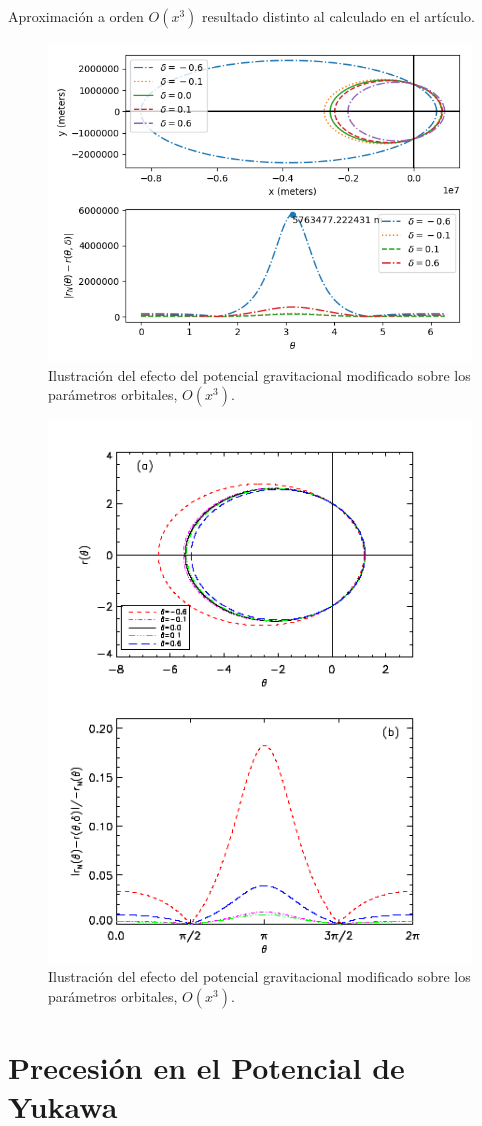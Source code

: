 \documentclass{beamer}
\begin{document}
\begin{frame}[allowframebreaks]{Aproximación a orden $O(x^3)$}
	resultado distinto al calculado en el artículo.
	\begin{figure}
	\centering
	\includegraphics[width=.8\textwidth]{orbits3.png}
	\caption{Ilustración del efecto del potencial gravitacional modificado sobre los parámetros orbitales, $O(x^3)$\cite{main}.}
	\end{figure}
	\begin{figure}
	\centering
	\includegraphics[width=.45\textwidth]{orbits3ref.png}
	\caption{Ilustración del efecto del potencial gravitacional modificado sobre los parámetros orbitales, $O(x^3)$\cite{main}.}
	\end{figure}
	\end{frame}	

	\section{Precesión en el Potencial de Yukawa}
	
\end{document}
